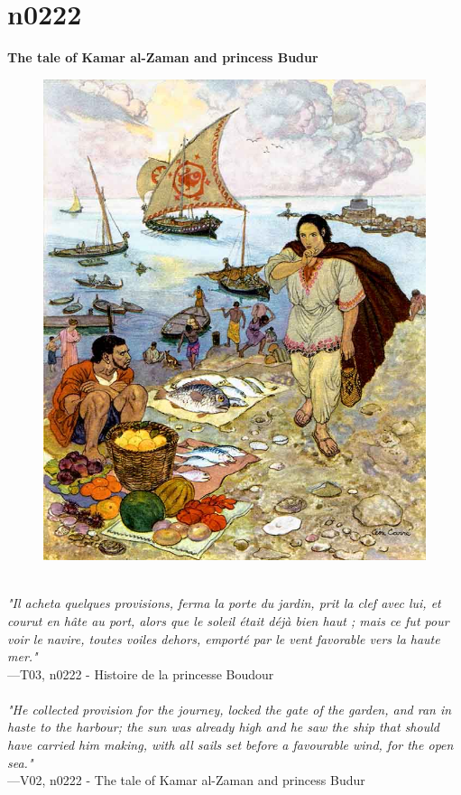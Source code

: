\documentclass[../Carre_nights.tex]{subfiles}
\begin{document}
\newpage

\section{n0222}
\textbf{\Large{The tale of Kamar al-Zaman and princess Budur}} \\

\begin{figure}[ht]
\centering
\includegraphics[height=\figsize]{illustrations/volume_3/T03, n0222 - Histoire de la princesse Boudour.jpg}
\end{figure}

\textit{\\
"Il acheta quelques provisions, ferma la porte du jardin, prit la clef avec lui, et courut en hâte au port, alors que le soleil était déjà bien haut ; mais ce fut pour voir le navire, toutes voiles dehors, emporté par le vent favorable vers la haute mer."} \\
—T03, n0222 - Histoire de la princesse Boudour \\~\\
\textit{"He collected provision for the journey, locked the gate of the garden, and ran in haste to the harbour; the sun was already high and he saw the ship that should have carried him making, with all sails set before a favourable wind, for the open sea."} \\
—V02, n0222 - The tale of Kamar al-Zaman and princess Budur
\end{document}
